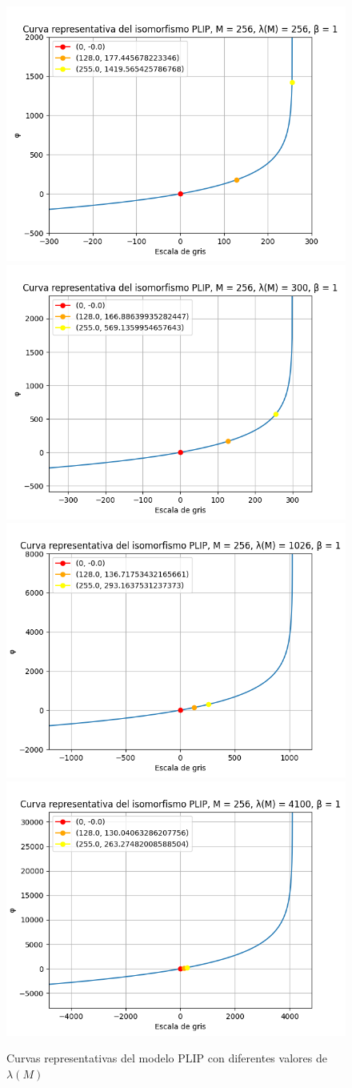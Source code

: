 \begin{figure}
	\begin{center}
		\includegraphics[width=5.5 cm]{images/plip_curves/plip_curve_256.png}
		\includegraphics[width=5.5 cm]{images/plip_curves/plip_curve_300.png}
		\includegraphics[width=5.5 cm]{images/plip_curves/plip_curve_1026.png}
		\includegraphics[width=5.5 cm]{images/plip_curves/plip_curve_4100.png}
		\caption{Curvas representativas del modelo PLIP con diferentes valores de $\lambda(M)$}
	\end{center}
\end{figure}

